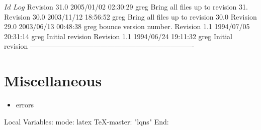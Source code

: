 \C 
\C $Id$
\C 
\C $Log$
\C Revision 31.0  2005/01/02 02:30:29  greg
\C Bring all files up to revision 31.
\C
\C Revision 30.0  2003/11/12 18:56:52  greg
\C Bring all files up to revision 30.0
\C
\C Revision 29.0  2003/06/13 00:48:38  greg
\C bounce version number.
\C
\C Revision 1.1  1994/07/05 20:31:14  greg
\C Initial revision
\C
\C Revision 1.1  1994/06/24  19:11:32  greg
\C Initial revision
\C
\C ----------------------------------------------------------------------
\chapter{Miscellaneous}
\label{sec:miscellaneous}

\begin{iftex}
\begin{itemize}
\item errors
\end{itemize}
\end{iftex}

\C Local Variables: 
\C mode: latex
\C TeX-master: "lqns"
\C End: 
